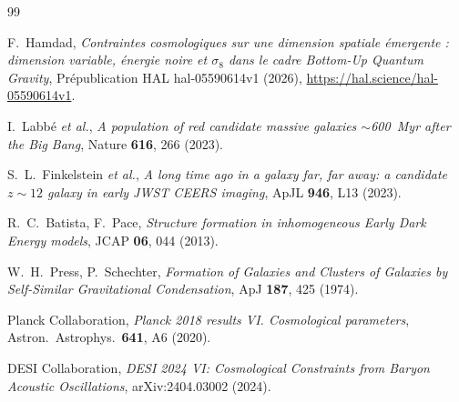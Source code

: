 \documentclass[11pt]{article}
\begin{document}

\begin{thebibliography}{99}

F.~Hamdad,
\textit{Contraintes cosmologiques sur une dimension spatiale émergente :
dimension variable, énergie noire et $\sigma_8$ dans le cadre
Bottom-Up Quantum Gravity},
Prépublication HAL hal-05590614v1 (2026),
\url{https://hal.science/hal-05590614v1}.

I.~Labbé \textit{et al.},
\textit{A population of red candidate massive galaxies $\sim$600~Myr
after the Big Bang},
Nature \textbf{616}, 266 (2023).

S.~L.~Finkelstein \textit{et al.},
\textit{A long time ago in a galaxy far, far away:
a candidate $z \sim 12$ galaxy in early JWST CEERS imaging},
ApJL \textbf{946}, L13 (2023).

R.~C.~Batista, F.~Pace,
\textit{Structure formation in inhomogeneous Early Dark Energy models},
JCAP \textbf{06}, 044 (2013).

W.~H.~Press, P.~Schechter,
\textit{Formation of Galaxies and Clusters of Galaxies by Self-Similar
Gravitational Condensation},
ApJ \textbf{187}, 425 (1974).

Planck Collaboration,
\textit{Planck 2018 results VI. Cosmological parameters},
Astron.\ Astrophys.\ \textbf{641}, A6 (2020).

DESI Collaboration,
\textit{DESI 2024 VI: Cosmological Constraints from Baryon Acoustic Oscillations},
arXiv:2404.03002 (2024).

\end{thebibliography}
\end{document}
